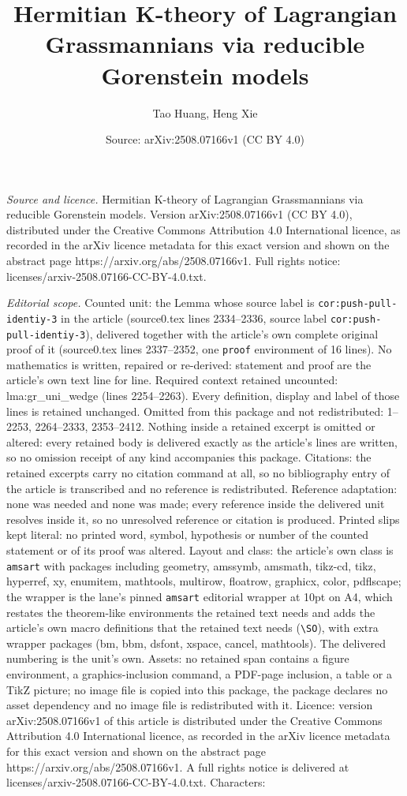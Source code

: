 \documentclass[10pt,a4paper]{amsart}
\title[Hermitian K-theory of Lagrangian Grassmannians via reducible]{Hermitian K-theory of Lagrangian Grassmannians via reducible Gorenstein models}
\author{Tao Huang, Heng Xie}
\date{Source: arXiv:2508.07166v1 (CC BY 4.0)}
\begin{document}
\maketitle

\noindent\emph{Source and licence.} Hermitian K-theory of Lagrangian Grassmannians via reducible Gorenstein models. Version arXiv:2508.07166v1 (CC BY 4.0), distributed under the Creative Commons Attribution 4.0 International licence, as recorded in the arXiv licence metadata for this exact version and shown on the abstract page https://arxiv.org/abs/2508.07166v1. Full rights notice: licenses/arxiv-2508.07166-CC-BY-4.0.txt.\par\smallskip

\noindent\textit{Editorial scope.} Counted unit: the Lemma whose source label is \texttt{cor:push-pull-identiy-3} in the article (source0.tex lines 2334--2336, source label \texttt{cor:push-pull-identiy-3}), delivered together with the article's own complete original proof of it (source0.tex lines 2337--2352, one \texttt{proof} environment of 16 lines). No mathematics is written, repaired or re-derived: statement and proof are the article's own text line for line. Required context retained uncounted: lma:gr\_uni\_wedge (lines 2254--2263). Every definition, display and label of those lines is retained unchanged. Omitted from this package and not redistributed: 1--2253, 2264--2333, 2353--2412. Nothing inside a retained excerpt is omitted or altered: every retained body is delivered exactly as the article's lines are written, so no omission receipt of any kind accompanies this package. Citations: the retained excerpts carry no citation command at all, so no bibliography entry of the article is transcribed and no reference is redistributed. Reference adaptation: none was needed and none was made; every reference inside the delivered unit resolves inside it, so no unresolved reference or citation is produced. Printed slips kept literal: no printed word, symbol, hypothesis or number of the counted statement or of its proof was altered. Layout and class: the article's own class is \texttt{amsart} with packages including geometry, amssymb, amsmath, tikz-cd, tikz, hyperref, xy, enumitem, mathtools, multirow, floatrow, graphicx, color, pdflscape; the wrapper is the lane's pinned \texttt{amsart} editorial wrapper at 10pt on A4, which restates the theorem-like environments the retained text needs and adds the article's own macro definitions that the retained text needs (\texttt{\textbackslash SO}), with extra wrapper packages (bm, bbm, dsfont, xspace, cancel, mathtools). The delivered numbering is the unit's own. Assets: no retained span contains a figure environment, a graphics-inclusion command, a PDF-page inclusion, a table or a TikZ picture; no image file is copied into this package, the package declares no asset dependency and no image file is redistributed with it. Licence: version arXiv:2508.07166v1 of this article is distributed under the Creative Commons Attribution 4.0 International licence, as recorded in the arXiv licence metadata for this exact version and shown on the abstract page https://arxiv.org/abs/2508.07166v1. A full rights notice is delivered at licenses/arxiv-2508.07166-CC-BY-4.0.txt. Characters: 
\end{document}

